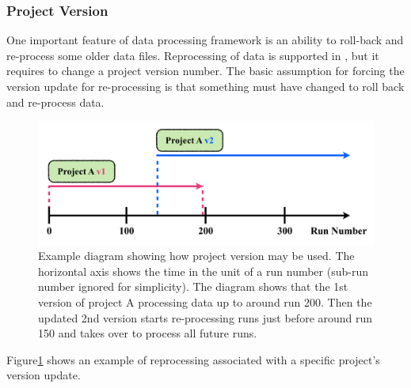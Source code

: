 \subsubsection{Project Version}
One important feature of data processing framework is an ability to roll-back
and re-process some older data files. Reprocessing of data is supported in
{\pubs}, but it requires to change a project version number. The basic 
assumption for forcing the version update for re-processing is that something
must have changed to roll back and re-process data. 
\begin{figure}[ht]\begin{center}
\includegraphics[width=14cm]{./img/PUB_ProjectVersion.pdf}
\caption{ Example diagram showing how project version may be used. 
The horizontal axis shows the time in the unit of a run number 
(sub-run number ignored for simplicity). The diagram shows that the 1st 
version of project A processing data up to around run 200. Then the updated 
2nd version starts re-processing runs just before around run 150 and takes 
over to process all future runs.}
\label{pubs:model:version}
\end{center}\end{figure}
Figure\ref{pubs:model:version} shows an example of reprocessing associated
with a specific project's version update.


